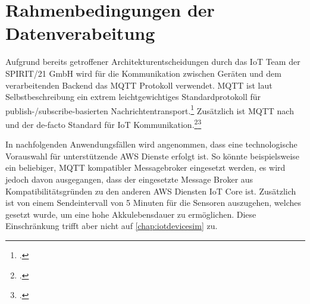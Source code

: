 \section{Rahmenbedingungen der Datenverabeitung}\label{chap:rahmendatenverarbeitung}
Aufgrund bereits getroffener Architekturentscheidungen durch das \ac{IoT} Team der SPIRIT/21 GmbH wird für die Kommunikation zwischen Geräten und dem verarbeitenden Backend das \ac{MQTT} Protokoll verwendet. \ac{MQTT} ist laut Selbstbeschreibung ein extrem leichtgewichtiges Standardprotokoll für publish-/subscribe-basierten Nachrichtentransport.\footcite[Vgl.][]{o.V..2020} Zusätzlich ist \ac{MQTT} nach \citeauthor{Skerrett.25.10.2019} und \citeauthor{Cabe.17.04.2018} der de-facto Standard für \ac{IoT} Kommunikation.\footcite[Vgl.][]{Skerrett.25.10.2019}\nzitat \footcite[Vgl.][]{Cabe.17.04.2018} 

In nachfolgenden Anwendungsfällen wird angenommen, dass eine technologische Vorauswahl für unterstützende \ac{AWS} Dienste erfolgt ist.
So könnte beispielsweise ein beliebiger, \ac{MQTT} kompatibler Messagebroker eingesetzt werden, es wird jedoch davon ausgegangen, dass der eingesetzte Message Broker aus Kompatibilitätsgründen zu den anderen \ac{AWS} Diensten \ac{IoT} Core ist. Zusätzlich ist von einem Sendeintervall von 5 Minuten für die Sensoren auszugehen, welches gesetzt wurde, um eine hohe Akkulebensdauer zu ermöglichen. Diese Einschränkung trifft aber nicht auf \autoref{chap:iotdevicesim} zu.

